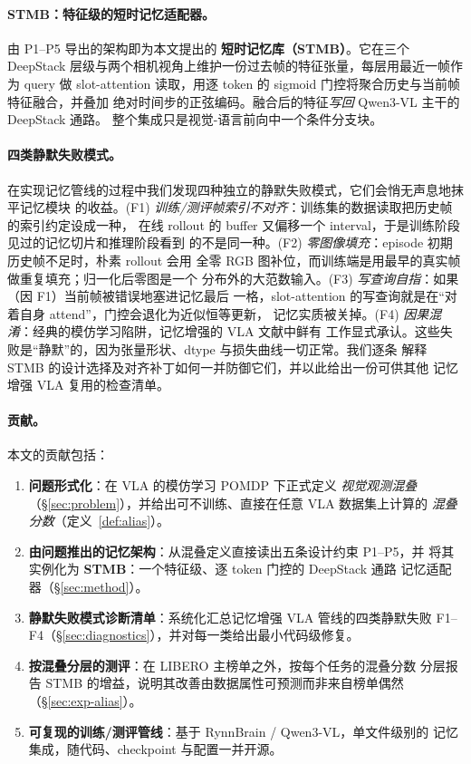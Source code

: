 \documentclass[11pt]{ctexart}
\begin{document}
\paragraph{STMB：特征级的短时记忆适配器。}
由 P1–P5 导出的架构即为本文提出的 \textbf{短时记忆库（STMB）}。它在三个 DeepStack
层级与两个相机视角上维护一份过去帧的特征张量，每层用最近一帧作为 query 做
slot-attention 读取，用逐 token 的 sigmoid 门控将聚合历史与当前帧特征融合，并叠加
绝对时间步的正弦编码。融合后的特征\emph{写回} Qwen3-VL 主干的 DeepStack 通路。
整个集成只是视觉-语言前向中一个条件分支块。

\paragraph{四类静默失败模式。}
在实现记忆管线的过程中我们发现四种独立的静默失败模式，它们会悄无声息地抹平记忆模块
的收益。(F1) \emph{训练/测评帧索引不对齐}：训练集的数据读取把历史帧的索引约定设成一种，
在线 rollout 的 buffer 又偏移一个 interval，于是训练阶段见过的记忆切片和推理阶段看到
的不是同一种。(F2) \emph{零图像填充}：episode 初期历史帧不足时，朴素 rollout 会用
全零 RGB 图补位，而训练端是用最早的真实帧做重复填充；归一化后零图是一个
分布外的大范数输入。(F3) \emph{写查询自指}：如果（因 F1）当前帧被错误地塞进记忆最后
一格，slot-attention 的写查询就是在“对着自身 attend”，门控会退化为近似恒等更新，
记忆实质被关掉。(F4) \emph{因果混淆}：经典的模仿学习陷阱，记忆增强的 VLA 文献中鲜有
工作显式承认。这些失败是“静默”的，因为张量形状、dtype 与损失曲线一切正常。我们逐条
解释 STMB 的设计选择及对齐补丁如何一并防御它们，并以此给出一份可供其他
记忆增强 VLA 复用的检查清单。

\paragraph{贡献。} 本文的贡献包括：
\begin{enumerate}
    \item \textbf{问题形式化}：在 VLA 的模仿学习 POMDP 下正式定义 \emph{视觉观测混叠}
    （\S\ref{sec:problem}），并给出可不训练、直接在任意 VLA 数据集上计算的
    \emph{混叠分数}（定义~\ref{def:alias}）。
    \item \textbf{由问题推出的记忆架构}：从混叠定义直接读出五条设计约束 P1–P5，并
    将其实例化为 \textbf{STMB}：一个特征级、逐 token 门控的 DeepStack 通路
    记忆适配器（\S\ref{sec:method}）。
    \item \textbf{静默失败模式诊断清单}：系统化汇总记忆增强 VLA 管线的四类静默失败
    F1–F4（\S\ref{sec:diagnostics}），并对每一类给出最小代码级修复。
    \item \textbf{按混叠分层的测评}：在 LIBERO 主榜单之外，按每个任务的混叠分数
    分层报告 STMB 的增益，说明其改善由数据属性可预测而非来自榜单偶然（\S\ref{sec:exp-alias}）。
    \item \textbf{可复现的训练/测评管线}：基于 RynnBrain / Qwen3-VL，单文件级别的
    记忆集成，随代码、checkpoint 与配置一并开源。
\end{enumerate}
\end{document}
